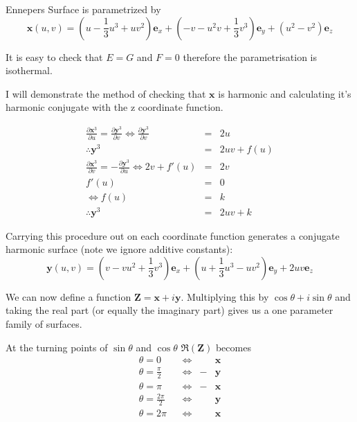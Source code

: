 \begin{example}
\label{Enneper}
Ennepers Surface is parametrized by 
\begin{displaymath}
\mathbf x(u,v) = (u-\frac{1}{3}u^3 + uv^2)\mathbf e_x + (-v-u^2v+\frac{1}{3}v^3)\mathbf e_y + (u^2-v^2)\mathbf e_z
\end{displaymath}

It is easy to check that $E=G$ and $F=0$ therefore the parametrisation is isothermal.

I will demonstrate the method of checking that $\mathbf x$ is harmonic and calculating it's harmonic conjugate with the z coordinate function.

\begin{eqnarray}
\nonumber
\frac{\partial \mathbf x^3}{\partial u}=\frac{\partial \mathbf y^3}{\partial v} \Leftrightarrow \frac{\partial \mathbf y^3}{\partial v} &=& 2u \\
\nonumber
\therefore \mathbf y^3 &=& 2uv + f(u) \\
\nonumber
\frac{\partial \mathbf x^3}{\partial v}=-\frac{\partial \mathbf y^3}{\partial u} \Leftrightarrow 2v + f'(u) &=& 2v \\
\nonumber
f'(u) &=& 0 \\
\nonumber
\Leftrightarrow f(u) &=& k \\
\nonumber
\therefore \mathbf y^3 &=& 2uv + k
\end{eqnarray}

Carrying this procedure out on each coordinate function generates a conjugate harmonic surface (note we ignore additive constants):
\begin{displaymath}
\mathbf y(u,v) = (v-vu^2+\frac{1}{3}v^3)\mathbf e_x + (u+\frac{1}{3}u^3-uv^2)\mathbf e_y + 2uv \mathbf e_z
\end{displaymath}

We can now define a function $\mathbf Z = \mathbf x + i \mathbf y$. Multiplying this by $\cos\theta + i \sin\theta$ and taking the real part (or equally the imaginary part) gives us a one parameter family of surfaces.

At the turning points of $\sin \theta$  and $\cos \theta$ $\Re (\mathbf Z)$ becomes
\begin{align}
\nonumber
&\theta = 0& &\Leftrightarrow& &\mathbf x& \\
\nonumber
&\theta = \frac{\pi}{2}& &\Leftrightarrow& -&\mathbf y&  \\
\nonumber
&\theta = \pi& &\Leftrightarrow& -&\mathbf x& \\
\nonumber
&\theta = \frac{2\pi}{2}& &\Leftrightarrow& &\mathbf y& \\
\nonumber
&\theta = 2\pi& &\Leftrightarrow& &\mathbf x&
\end{align}


\end{example}
